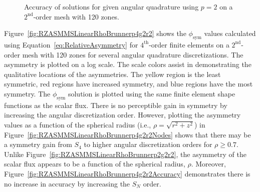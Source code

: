 \documentclass[12pt]{article}
\begin{document}
\begin{figure}[!htb]
\centering
{}
\caption{Accuracy of solutions for given angular quadrature using $p=2$ on a $2^\text{nd}$-order mesh with 120 zones.}
\label{fig:RZASMMSLinearRhoBrunnerp2g2r2Accuracy}
\end{figure}

\FloatBarrier

Figure~\ref{fig:RZASMMSLinearRhoBrunnerp4g2r2} shows the $\phi_\text{sym}$ values calculated using Equation~\ref{eq:RelativeAsymmetry} for $4^\text{th}$-order finite elements on a $2^\text{nd}$-order mesh with 120 zones for several angular quadrature discretizations. The asymmetry is plotted on a log scale. The scale colors assist in demonstrating the qualitative locations of the asymmetries. The yellow region is the least symmetric, red regions have increased symmetry, and blue regions have the most symmetry. The $\phi_\text{sym}$ solution is plotted using the same finite element shape functions as the scalar flux. There is no perceptible gain in symmetry by increasing the angular discretization order. However, plotting the asymmetry values as a function of the spherical radius (i.e., $\rho=\sqrt{r^2+z^2}$) in Figure~\ref{fig:RZASMMSLinearRhoBrunnerp4g2r2Nodes} shows that there may be a symmetry gain from $S_4$ to higher angular discretization orders for $\rho \geq 0.7$. Unlike Figure~\ref{fig:RZASMMSLinearRhoBrunnerp2g2r2}, the asymmetry of the scalar flux appears to be a function of the spherical radius, $\rho$. Moreover, Figure~\ref{fig:RZASMMSLinearRhoBrunnerp4g2r2Accuracy} demonstrates there is no increase in accuracy by increasing the $S_N$ order.
\end{document}

